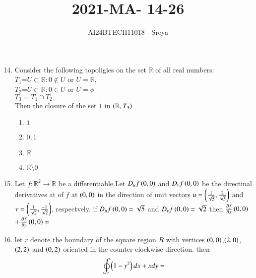 \documentclass[journal]{IEEEtran}
\begin{document}

\vspace{3cm}

\title{2021-MA- 14-26}
\author{AI24BTECH11018 - Sreya}

{\let\newpage\relax\maketitle}

\renewcommand{\thefigure}{\theenumi}
\renewcommand{\thetable}{\theenumi}
\setlength{\intextsep}{10pt} %

\begin{enumerate}
\setcounter{enumi}{13}
\item Consider the following topoligies on the set $\mathbb{R}$ of all real numbers:\\
$T_1$={$U \subset \mathbb{R} :0 \notin U$ or $U=\mathbb{R}$},\\
$T_2$={$U \subset \mathbb{R} :0 \in U$ or $U=\phi$ }\\
$T_3=T_1 \cap T_2$\\
Then the closure of the set ${1}$ in $\left(\mathbb{R},T_3\right)$
\begin{enumerate}
    \item ${1}$
    \item $0,1$
    \item ${\mathbb{R}}$
    \item $\mathbb{R} \texttt{\textbackslash} {0}$
\end{enumerate}
\item Let $f:{\mathbb{R}}^2\rightarrow \mathbb{R}$ be a differentiable.Let $D_uf\left(0,0\right)$ and $D_vf\left(0,0\right)$ be the directinal derivatives at of $f$ at $\left(0,0\right)$ in the direction of unit vectors $u=\left(\frac{1}{\sqrt{5}},\frac{2}{\sqrt{5}}\right)$ and $v=\left(\frac{1}{\sqrt{2}},\frac{-1}{\sqrt{2}}\right)$. respectvely. if $D_uf\left(0,0\right)=\sqrt{5}$ and $D_vf\left(0,0\right)=\sqrt{2}$ then $\frac{\partial f}{\partial x}\left(0,0\right)$+$\frac{\partial f}{\partial y}\left(0,0\right)=$
\item let $r$ denote the boundary of the square region $R$ with vertices $\left(0,0\right)$,$\left(2,0\right)$,$\left(2,2\right)$ and $\left(0,2\right)$ oriented in the counter-clockwise direction. then \begin{equation}
\oint_r \left(1-y^2\right)dx+x dy=
\end{equation}

\end{enumerate}
\end{document}
